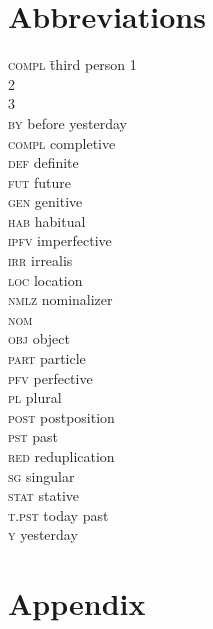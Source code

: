 \documentclass[output=paper,newtxmath,modfonts,nonflat,draftmode]{langsci/langscibook}
\begin{document}
\pagebreak\section*{Abbreviations}
\begin{multicols}{2}
\begin{tabbing}
\textsc{compl}\hspace{.5em} \= third person\kill
\textsc{1} \>  \\
\textsc{2} \>   \\
\textsc{3} \>   \\
\textsc{by} \>   before yesterday\\
\textsc{compl} \>   completive\\
\textsc{def}   \>   definite\\
\textsc{fut} \>   future\\
\textsc{gen} \>   genitive\\
\textsc{hab} \>  habitual\\
\textsc{ipfv} \>  imperfective\\
\textsc{irr} \>   irrealis\\
\textsc{loc} \>   location\\
\textsc{nmlz} \>   nominalizer\\
\textsc{nom} \>   \\
\textsc{obj} \>   object\\
\textsc{part} \>   particle\\
\textsc{pfv} \>   perfective\\
\textsc{pl} \>   plural\\
\textsc{post} \>   postposition\\
\textsc{pst}   \>   past\\
\textsc{red} \>   reduplication\\
\textsc{sg} \>   singular\\
\textsc{stat} \>   stative\\
\textsc{t.pst} \>   today past\\
\textsc{y} \>   yesterday
\end{tabbing}
\end{multicols}


\section*{Appendix}
\end{document}
